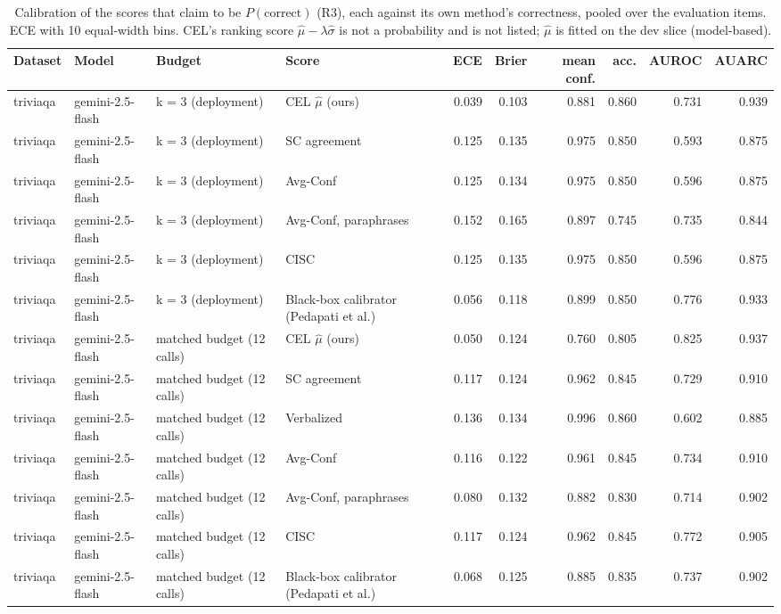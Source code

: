 \begin{table}[t]
\centering
\small
\begin{tabular}{llllrrrrrr}
\toprule
Dataset & Model & Budget & Score & ECE & Brier & mean conf. & acc. & AUROC & AUARC \\
\midrule
triviaqa & gemini-2.5-flash & k = 3 (deployment) & CEL $\hat\mu$ (ours) & 0.039 & 0.103 & 0.881 & 0.860 & 0.731 & 0.939 \\
triviaqa & gemini-2.5-flash & k = 3 (deployment) & SC agreement & 0.125 & 0.135 & 0.975 & 0.850 & 0.593 & 0.875 \\
triviaqa & gemini-2.5-flash & k = 3 (deployment) & Avg-Conf & 0.125 & 0.134 & 0.975 & 0.850 & 0.596 & 0.875 \\
triviaqa & gemini-2.5-flash & k = 3 (deployment) & Avg-Conf, paraphrases & 0.152 & 0.165 & 0.897 & 0.745 & 0.735 & 0.844 \\
triviaqa & gemini-2.5-flash & k = 3 (deployment) & CISC & 0.125 & 0.135 & 0.975 & 0.850 & 0.596 & 0.875 \\
triviaqa & gemini-2.5-flash & k = 3 (deployment) & Black-box calibrator (Pedapati et al.) & 0.056 & 0.118 & 0.899 & 0.850 & 0.776 & 0.933 \\
triviaqa & gemini-2.5-flash & matched budget (12 calls) & CEL $\hat\mu$ (ours) & 0.050 & 0.124 & 0.760 & 0.805 & 0.825 & 0.937 \\
triviaqa & gemini-2.5-flash & matched budget (12 calls) & SC agreement & 0.117 & 0.124 & 0.962 & 0.845 & 0.729 & 0.910 \\
triviaqa & gemini-2.5-flash & matched budget (12 calls) & Verbalized & 0.136 & 0.134 & 0.996 & 0.860 & 0.602 & 0.885 \\
triviaqa & gemini-2.5-flash & matched budget (12 calls) & Avg-Conf & 0.116 & 0.122 & 0.961 & 0.845 & 0.734 & 0.910 \\
triviaqa & gemini-2.5-flash & matched budget (12 calls) & Avg-Conf, paraphrases & 0.080 & 0.132 & 0.882 & 0.830 & 0.714 & 0.902 \\
triviaqa & gemini-2.5-flash & matched budget (12 calls) & CISC & 0.117 & 0.124 & 0.962 & 0.845 & 0.772 & 0.905 \\
triviaqa & gemini-2.5-flash & matched budget (12 calls) & Black-box calibrator (Pedapati et al.) & 0.068 & 0.125 & 0.885 & 0.835 & 0.737 & 0.902 \\
\bottomrule
\end{tabular}
\caption{Calibration of the scores that claim to be $P(\text{correct})$ (R3), each against its own method's correctness, pooled over the evaluation items. ECE with 10 equal-width bins. CEL's ranking score $\hat\mu - \lambda\hat\sigma$ is not a probability and is not listed; $\hat\mu$ is fitted on the dev slice (model-based).}
\label{tab:calibration}
\end{table}
